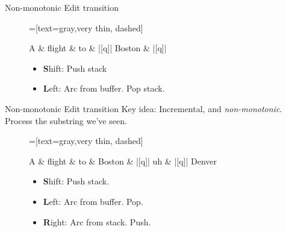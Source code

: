 \documentclass[color=usenames,dvipsnames]{lecture}
\begin{document}
\begin{plain}{Non-monotonic Edit transition}

\begin{figure}
    \centering
    \begin{dependency}[theme=simple]
    =[text=gray,very thin, dashed]
    \begin{deptext}[column sep=.075cm, row sep=.1ex]
        A \& flight \& to \& |[q]| Boston \& |[q]| \\
    \end{deptext}
\end{dependency}

\begin{itemize}
  \item \textbf{S}hift: Push stack
  \item \textbf{L}eft: Arc from buffer. Pop stack.
\end{itemize}

\end{figure}
\end{plain}


\begin{plain}{Non-monotonic Edit transition}
Key idea: Incremental, and \emph{non-monotonic}.\\
Process the substring we've seen.\\
\begin{figure}
    \centering
    \begin{dependency}[theme=simple]
    =[text=gray,very thin, dashed]
    \begin{deptext}[column sep=.075cm, row sep=.1ex]
        A \& flight \& to \&  Boston \& |[q]| uh \& |[q]| Denver \\
    \end{deptext}
\end{dependency}

\begin{itemize}
  \item \textbf{S}hift: Push stack.
  \item \textbf{L}eft: Arc from buffer. Pop.
  \item \textbf{R}ight: Arc from stack. Push.
\end{itemize}

\end{figure}
\end{plain}
\end{document}
